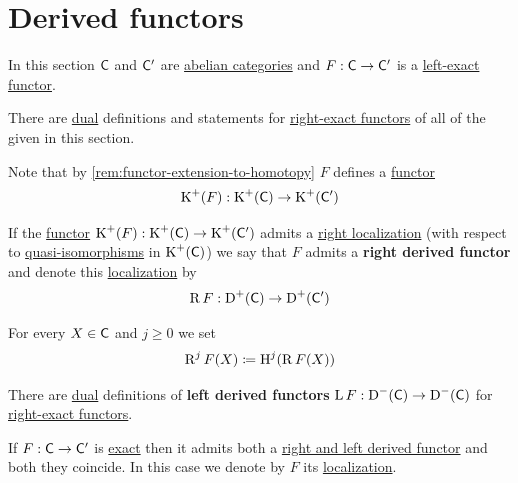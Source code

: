 \documentclass[../../main]{subfiles}
\begin{document}
\section{Derived functors}
In this section \(\mathsf{C}\) and \(\mathsf{C'}\) are \hyperref[def:abelian-category]{abelian categories} and \(F: \mathsf{C} \to \mathsf{C'}\) is a \hyperref[def:left-exact]{left-exact functor}.

There are \hyperref[def:dual]{dual} definitions and statements for \hyperref[def:left-exact]{right-exact functors} of all of the given in this section.

Note that by \autoref{rem:functor-extension-to-homotopy} \(F\) defines a \hyperref[def:functor]{functor}
\begin{equation*}
  \operatorname{K}^{+}(F): \operatorname{K}^{+}(\mathsf{C}) \to \operatorname{K}^{+}(\mathsf{C'})
\end{equation*}

\begin{definition}\label{def:right-derived-functor}
  If the \hyperref[def:functor]{functor} \(\operatorname{K}^{+}(F): \operatorname{K}^{+}(\mathsf{C}) \to \operatorname{K}^{+}(\mathsf{C'})\) admits a \hyperref[def:localization-functor]{right localization} (with respect to \hyperref[def:quasi-isomorphism]{quasi-isomorphisms} in \(\operatorname{K}^{+}(\mathsf{C})\)) we say that \(F\) admits a \textbf{right derived functor} and denote this \hyperref[def:localization-functor]{localization} by
  \begin{equation*}
    \operatorname{R}F: \operatorname{D}^{+}(\mathsf{C}) \to \operatorname{D}^{+}(\mathsf{C'})
  \end{equation*}

  For every \(X \in \mathsf{C}\) and \(j \geq 0\) we set
  \begin{equation*}
    \operatorname{R}^{j}F(X) \coloneq \operatorname{H}^{j}(\operatorname{R}F(X))
  \end{equation*}

  There are \hyperref[def:dual]{dual} definitions of \textbf{left derived functors} \(\operatorname{L}F: \operatorname{D}^{-}(\mathsf{C}) \to \operatorname{D}^{-}(\mathsf{C})\) for \hyperref[def:exact-functor]{right-exact functors}.
\end{definition}

\begin{notation}
  If \(F: \mathsf{C} \to \mathsf{C'}\) is \hyperref[def:exact-functor]{exact} then it admits both a \hyperref[def:right-derived-functor]{right and left derived functor} and both they coincide.
  In this case we denote by \(F\) its \hyperref[def:localization-functor]{localization}.
\end{notation}
\end{document}
